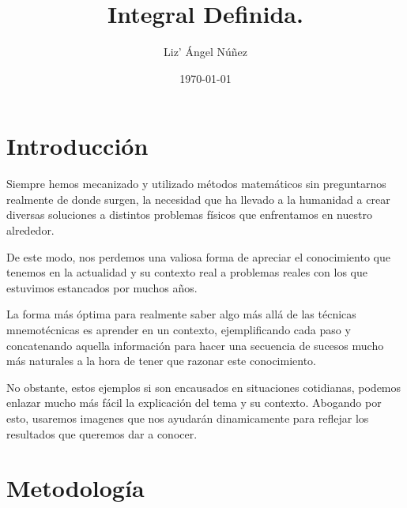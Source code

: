\documentclass[twocolumn]{article}
\title{Integral Definida.}
\author{Liz' Ángel Núñez}
\date{\today}
\begin{document}


\section{Introducción}
\begin{justify}
Siempre hemos mecanizado y utilizado métodos matemáticos sin preguntarnos realmente de donde surgen, la necesidad que ha llevado a la humanidad a crear diversas soluciones a distintos problemas físicos que enfrentamos en nuestro alrededor.
\end{justify}
\vspace{\baselineskip}
\begin{justify}
De este modo, nos perdemos una valiosa forma de apreciar el conocimiento que tenemos en la actualidad y su contexto real a problemas reales con los que estuvimos estancados por muchos años.
\end{justify}
\vspace{\baselineskip}
\begin{justify}
La forma más óptima para realmente saber algo más allá de las técnicas mnemotécnicas es aprender en un contexto, ejemplificando cada paso y concatenando aquella información para hacer una secuencia de sucesos mucho más naturales a la hora de tener que razonar 
este conocimiento.
\end{justify}
\vspace{\baselineskip}
\begin{justify}
No obstante, estos ejemplos si son encausados en situaciones cotidianas, podemos enlazar mucho más fácil la explicación del tema y su contexto. Abogando por esto, usaremos imagenes que nos ayudarán dinamicamente para reflejar los resultados que queremos dar a conocer.
\end{justify}
\section{Metodología}
\end{document}
